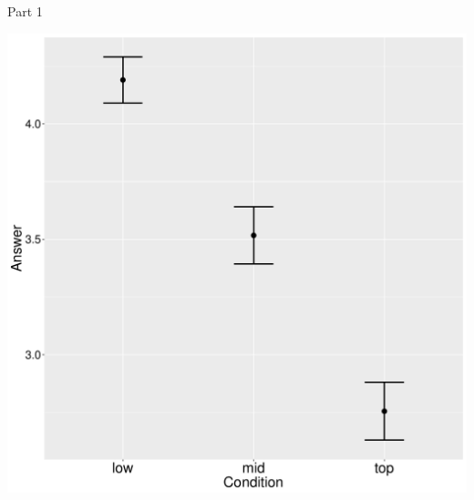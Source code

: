 \documentclass[ignorenonframetext,]{beamer}
\begin{document}
\begin{frame}{Part 1}

\begin{center}
\includegraphics[scale=0.3]{exp1-ani-part_1-errorbars.pdf}
\end{center}

\end{frame}
\end{document}
